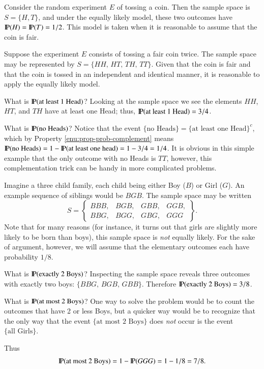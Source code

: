 \documentclass[captions=tableheading]{scrbook}
\begin{document}
\begin{example}
Consider the random experiment \(E\) of tossing a coin. Then the sample space is \(S=\{H,T\}\), and under the equally likely model, these two outcomes have \(\P(H)=\P(T)=1/2\). This model is taken when it is reasonable to assume that the coin is fair.
\end{example}

\begin{example}
Suppose the experiment \(E\) consists of tossing a fair coin twice. The sample space may be represented by \(S=\{HH,\, HT,\, TH,\, TT\}\). Given that the coin is fair and that the coin is tossed in an independent and identical manner, it is reasonable to apply the equally likely model. 

What is \(\P(\mbox{at least 1 Head})\)? Looking at the sample space we see the elements \(HH\), \(HT\), and \(TH\) have at least one Head; thus, \(\P(\mbox{at least 1 Head})=3/4\). 

What is \(\P(\mbox{no Heads})\)? Notice that the event \(\{ \mbox{no Heads} \} = \{ \mbox{at least one Head} \} ^{c}\), which by Property \ref{enu:prop-prob-complement} means \(\P(\mbox{no Heads})=1-\P(\mbox{at least one head})=1-3/4=1/4\). It is obvious in this simple example that the only outcome with no Heads is \(TT\), however, this complementation trick can be handy in more complicated problems.
\end{example}

\begin{example}
\label{exa:three-child-family}
Imagine a three child family, each child being either Boy (\(B\)) or Girl (\(G\)). An example sequence of siblings would be \(BGB\). The sample space may be written
\[
S=\left\{ 
\begin{array}{cccc}
BBB, & BGB, & GBB, & GGB,\\
BBG, & BGG, & GBG, & GGG
\end{array}
\right\}.
\]
Note that for many reasons (for instance, it turns out that girls are slightly more likely to be born than boys), this sample space is \emph{not} equally likely. For the sake of argument, however, we will assume that the elementary outcomes each have probability \(1/8\).

What is \(\P(\mbox{exactly 2 Boys})\)? Inspecting the sample space reveals three outcomes with exactly two boys: \( \{ BBG,\, BGB,\, GBB \} \).  Therefore \(\P(\mbox{exactly 2 Boys})=3/8\). 

What is \(\P(\mbox{at most 2 Boys})\)? One way to solve the problem would be to count the outcomes that have 2 or less Boys, but a quicker way would be to recognize that the only way that the event \(\{ \mbox{at most 2 Boys} \}\) does \emph{not} occur is the event \(\{ \mbox{all Girls} \}\).

Thus
\[
\P(\mbox{at most 2 Boys})=1-\P(GGG)=1-1/8=7/8.
\]

\end{example}
\end{document}
